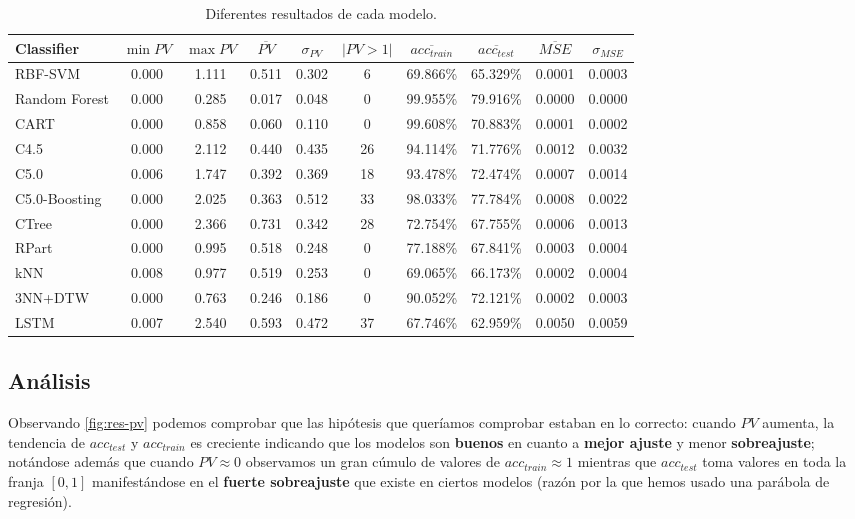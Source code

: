\begin{table}[htbp]
\centering
\begin{tabular}{||l | c c c c c c c c c||}
 \hline
 Classifier & $\min PV$ & $\max PV$ & $\overline{PV}$ & $\sigma_{PV}$ & $|PV > 1|$ & $\overline{acc_{train}}$ & $\overline{acc_{test}}$ & $\overline{MSE}$ & $\sigma_{MSE}$ \\ [0.5ex]
 \hline\hline
 RBF-SVM & 0.000 & 1.111 & 0.511 & 0.302 & 6 & 69.866\% & 65.329\% & 0.0001 & 0.0003 \\
 Random Forest & 0.000 & 0.285 & 0.017 & 0.048 & 0 & 99.955\% & 79.916\% & 0.0000 & 0.0000 \\
 CART & 0.000 & 0.858 & 0.060 & 0.110 & 0 & 99.608\% & 70.883\% & 0.0001 & 0.0002 \\
 C4.5 & 0.000 & 2.112 & 0.440 & 0.435 & 26 & 94.114\% & 71.776\% & 0.0012 & 0.0032 \\
 C5.0 & 0.006 & 1.747 & 0.392 & 0.369 & 18 & 93.478\% & 72.474\% & 0.0007 & 0.0014 \\
 C5.0-Boosting & 0.000 & 2.025 & 0.363 & 0.512 & 33 & 98.033\% & 77.784\% & 0.0008 & 0.0022 \\
 CTree & 0.000 & 2.366 & 0.731 & 0.342 & 28 & 72.754\% & 67.755\% & 0.0006 & 0.0013 \\
 RPart & 0.000 & 0.995 & 0.518 & 0.248 & 0 & 77.188\% & 67.841\% & 0.0003 & 0.0004 \\
 kNN & 0.008 & 0.977 & 0.519 & 0.253 & 0 & 69.065\% & 66.173\% & 0.0002 & 0.0004 \\
 3NN+DTW & 0.000 & 0.763 & 0.246 & 0.186 & 0 & 90.052\% & 72.121\% & 0.0002 & 0.0003 \\
 LSTM & 0.007 & 2.540 & 0.593 & 0.472 & 37 & 67.746\% & 62.959\% & 0.0050 & 0.0059 \\ [1ex]
 \hline
\end{tabular}
\caption{Diferentes resultados de cada modelo.}
\label{table:datos-modelos}
\end{table}

\subsection{Análisis}

Observando \autoref{fig:res-pv} podemos comprobar que las hipótesis que queríamos comprobar estaban en lo correcto: cuando $PV$ aumenta, la tendencia de $acc_{test}$ y $acc_{train}$ es creciente indicando que los modelos son \textbf{buenos} en cuanto a \textbf{mejor ajuste} y menor \textbf{sobreajuste}; notándose además que cuando $PV \approx 0$ observamos un gran cúmulo de valores de $acc_{train} \approx 1$ mientras que $acc_{test}$ toma valores en toda la franja $[0,1]$ manifestándose en el \textbf{fuerte sobreajuste} que existe en ciertos modelos (razón por la que hemos usado una parábola de regresión).


